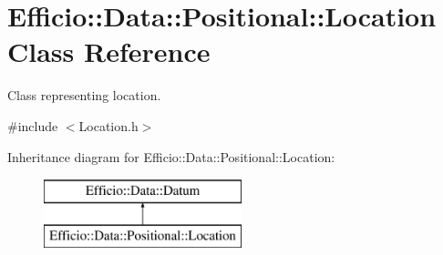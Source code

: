 \hypertarget{class_efficio_1_1_data_1_1_positional_1_1_location}{}\section{Efficio\+:\+:Data\+:\+:Positional\+:\+:Location Class Reference}
\label{class_efficio_1_1_data_1_1_positional_1_1_location}


Class representing location.  




{\ttfamily \#include $<$Location.\+h$>$}

Inheritance diagram for Efficio\+:\+:Data\+:\+:Positional\+:\+:Location\+:\begin{figure}[H]
\begin{center}
\leavevmode
\includegraphics[height=2.000000cm]{class_efficio_1_1_data_1_1_positional_1_1_location}
\end{center}
\end{figure}
